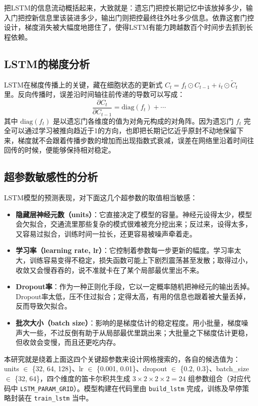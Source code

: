 \documentclass[12pt,a4paper,oneside]{ctexbook}
\begin{document}
	把LSTM的信息流动概括起来，大致就是：遗忘门把控长期记忆中该放掉多少，输入门把控新信息里该装进多少，输出门则把控最终往外吐多少信息。依靠这套门控设计，梯度消失被大幅度地摁住了，使得LSTM有能力跨越数百个时间步去抓到长程依赖。
	
	\subsection{LSTM的梯度分析}
	
	LSTM在梯度传播上的关键，藏在细胞状态的更新式 $C_t = f_t \odot C_{t-1} + i_t \odot \tilde{C}_t$ 里。反向传播时，误差沿时间轴往前传递的导数可以写成：
	\[
	\frac{\partial C_t}{\partial C_{t-1}} = \text{diag}(f_t) + \cdots
	\]
	其中 $\text{diag}(f_t)$ 是以遗忘门各维度的值为对角元构成的对角阵。因为遗忘门 $f_t$ 完全可以通过学习被推向趋近于1的方向，也即把长期记忆近乎原封不动地保留下来，梯度就不会跟着传播步数的增加而出现指数式衰减，误差在网络里沿着时间往回传的时候，便能够保持相对稳定。
	
	\subsection{超参数敏感性的分析}
	
	LSTM模型的预测表现，对下面这几个超参数的取值相当敏感：
	
	\begin{itemize}
		\item \textbf{隐藏层神经元数（units）}：它直接决定了模型的容量。神经元设得太少，模型会欠拟合，交通流里那些复杂的模式很难被充分挖出来；反过来，设得太多，又容易过拟合，训练时间一拉长，还更容易被噪声牵着走。
		\item \textbf{学习率（learning rate, lr）}：它控制着参数每一步更新的幅度。学习率太大，训练容易变得不稳定，损失函数可能上下剧烈震荡甚至发散；取得过小，收敛又会慢吞吞的，说不准就卡在了某个局部最优里出不来。
		\item \textbf{Dropout率}：作为一种正则化手段，它以一定概率随机把神经元的输出丢掉。Dropout率太低，压不住过拟合；定得太高，有用的信息也跟着被大量丢掉，反而导致欠拟合。
		\item \textbf{批次大小（batch size）}：影响的是梯度估计的稳定程度。用小批量，梯度噪声大一些，不过反倒有助于从局部最优里跳出来；大批量之下梯度估计更稳，但收敛会变慢，而且还更吃内存。
	\end{itemize}
	
	本研究就是绕着上面这四个关键超参数来设计网格搜索的，各自的候选值为：units $\in$ \{32, 64, 128\}、lr $\in$ \{0.001, 0.01\}、dropout $\in$ \{0.2, 0.3\}、batch\_size $\in$ \{32, 64\}，四个维度的笛卡尔积共生成 $3\times2\times2\times2=24$ 组参数组合（对应代码中 \texttt{LSTM\_PARAM\_GRID}）。模型构建在代码里由 \texttt{build\_lstm} 完成，训练及早停策略封装在 \texttt{train\_lstm} 当中。
	
\end{document}
